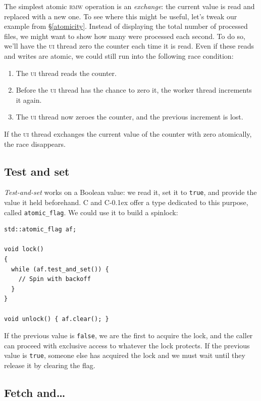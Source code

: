\documentclass[fontsize=10pt, numbers=endperiod]{scrartcl}
\newcommand{\codesize}{\fontsize{10pt}{12pt}}
\newcommand{\monobox}[1]{\mbox{\texttt{#1}}}
\newcommand{\cpp}[1]{C\kern-0.1ex\raisebox{0.15ex}{\texttt{++}}{\addfontfeature{Numbers=LowercaseOff}#1}}
\newcommand{\introduce}[1]{\textit{#1}}
\newcommand{\secref}[1]{\hyperref[#1]{\textsc{\S}\ref*{#1}}}
\newenvironment{colfigure}
  {\par\vspace{1\baselineskip minus 0.5\baselineskip}\noindent\minipage{\linewidth}}
  {\endminipage\vspace*{1\baselineskip minus 0.7\baselineskip}}
\begin{document}
\begin{multicols*}{2}
The simplest atomic \textsc{rmw} operation is an \introduce{exchange}:
the current value is read and replaced with a new one.
To see where this might be useful,
let's tweak our example from \secref{atomicity}.
Instead of displaying the total number of processed files,
we might want to show how many were processed each second.
To do so, we'll have the \textsc{ui} thread zero the counter each time it
is read.
Even if these reads and writes are atomic,
we could still run into the following race condition:
\begin{enumerate}
\item The \textsc{ui} thread reads the counter.
\item Before the \textsc{ui} thread has the chance to zero it,
    the worker thread increments it again.
\item The \textsc{ui} thread now zeroes the counter, and the previous increment
    is lost.
\end{enumerate}
If the \textsc{ui} thread exchanges the current
value of the counter with zero atomically, the race disappears.

\subsection{Test and set}

\introduce{Test-and-set} works on a Boolean value:
we read it, set it to \texttt{true}, and provide the value it
held beforehand.
C and \cpp{} offer a type dedicated to this purpose, called \monobox{atomic\_flag}.
We could use it to build a spinlock:
\label{spinlock}
\begin{colfigure}
\begin{verbatim}
std::atomic_flag af;

void lock()
{
  while (af.test_and_set()) {
    // Spin with backoff
  }
}

void unlock() { af.clear(); }
\end{verbatim}
\end{colfigure}
If the previous value is \texttt{false},
we are the first to acquire the lock,
and the caller can proceed with exclusive access to whatever the lock protects.
If the previous value is \texttt{true},
someone else has acquired the lock and we must
wait until they release it by clearing the flag.

\subsection{Fetch and…}


\end{multicols*}
\end{document}

